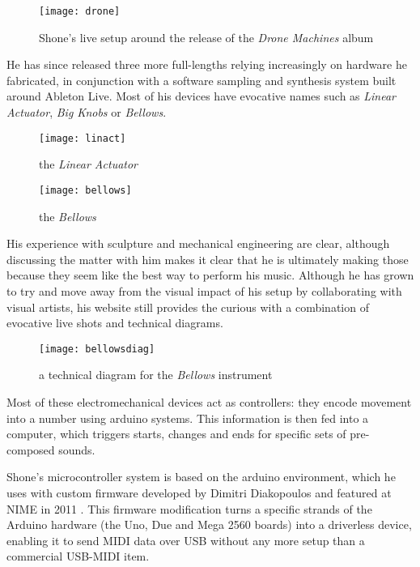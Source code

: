 	\begin{figure}[h!]
	  \caption{Shone's live setup around the release of the \emph{Drone Machines} album}
	  \centering
	    \texttt{[image: drone]}
	\end{figure}
	
He has since released three more full-lengths relying increasingly on hardware he fabricated, in conjunction with a software sampling and synthesis system built around Ableton Live. Most of his devices have evocative names such as \emph{Linear Actuator}, \emph{Big Knobs} or \emph{Bellows}. 

	\begin{figure}[h!]
	  \caption{the \emph{Linear Actuator}}
	  \centering
	    \texttt{[image: linact]}
	\end{figure}

	\begin{figure}[h!]
	  \caption{the \emph{Bellows}}
	  \centering
	    \texttt{[image: bellows]}
	\end{figure}

His experience with sculpture and mechanical engineering are clear, although discussing the matter with him makes it clear that he is ultimately making those because they seem like the best way to perform his music. Although he has grown to try and move away from the visual impact of his setup by collaborating with visual artists, his website still provides the curious with a combination of evocative live shots and technical diagrams. 

	\begin{figure}[h!]
	  \caption{a technical diagram for the \emph{Bellows} instrument}
	  \centering
	    \texttt{[image: bellowsdiag]}
	\end{figure}
	
Most of these electromechanical devices act as controllers: they encode movement into a number using arduino systems. This information is then fed into a computer, which triggers starts, changes and ends for specific sets of pre-composed sounds. 

Shone's microcontroller system is based on the arduino environment, which he uses with custom firmware developed by Dimitri Diakopoulos and featured at NIME in 2011 \citep{diakopoulos2011,diakopoulos2015} . This firmware modification turns a specific strands of the Arduino hardware (the Uno, Due and Mega 2560 boards) into a driverless device, enabling it to send MIDI data over USB without any more setup than a commercial USB-MIDI item. 

